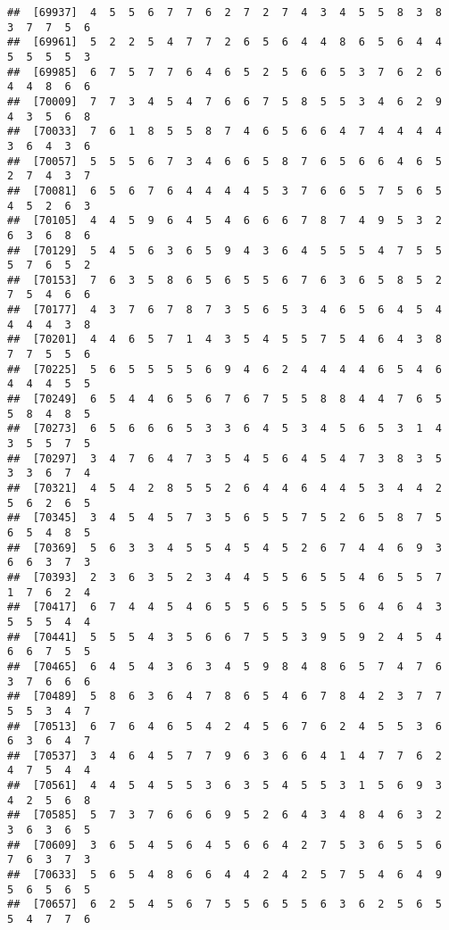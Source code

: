 \documentclass[
]{book}
\begin{document}
\begin{verbatim}
##  [69937]  4  5  5  6  7  7  6  2  7  2  7  4  3  4  5  5  8  3  8  3  7  7  5  6
##  [69961]  5  2  2  5  4  7  7  2  6  5  6  4  4  8  6  5  6  4  4  5  5  5  5  3
##  [69985]  6  7  5  7  7  6  4  6  5  2  5  6  6  5  3  7  6  2  6  4  4  8  6  6
##  [70009]  7  7  3  4  5  4  7  6  6  7  5  8  5  5  3  4  6  2  9  4  3  5  6  8
##  [70033]  7  6  1  8  5  5  8  7  4  6  5  6  6  4  7  4  4  4  4  3  6  4  3  6
##  [70057]  5  5  5  6  7  3  4  6  6  5  8  7  6  5  6  6  4  6  5  2  7  4  3  7
##  [70081]  6  5  6  7  6  4  4  4  4  5  3  7  6  6  5  7  5  6  5  4  5  2  6  3
##  [70105]  4  4  5  9  6  4  5  4  6  6  6  7  8  7  4  9  5  3  2  6  3  6  8  6
##  [70129]  5  4  5  6  3  6  5  9  4  3  6  4  5  5  5  4  7  5  5  5  7  6  5  2
##  [70153]  7  6  3  5  8  6  5  6  5  5  6  7  6  3  6  5  8  5  2  7  5  4  6  6
##  [70177]  4  3  7  6  7  8  7  3  5  6  5  3  4  6  5  6  4  5  4  4  4  4  3  8
##  [70201]  4  4  6  5  7  1  4  3  5  4  5  5  7  5  4  6  4  3  8  7  7  5  5  6
##  [70225]  5  6  5  5  5  5  6  9  4  6  2  4  4  4  4  6  5  4  6  4  4  4  5  5
##  [70249]  6  5  4  4  6  5  6  7  6  7  5  5  8  8  4  4  7  6  5  5  8  4  8  5
##  [70273]  6  5  6  6  6  5  3  3  6  4  5  3  4  5  6  5  3  1  4  3  5  5  7  5
##  [70297]  3  4  7  6  4  7  3  5  4  5  6  4  5  4  7  3  8  3  5  3  3  6  7  4
##  [70321]  4  5  4  2  8  5  5  2  6  4  4  6  4  4  5  3  4  4  2  5  6  2  6  5
##  [70345]  3  4  5  4  5  7  3  5  6  5  5  7  5  2  6  5  8  7  5  6  5  4  8  5
##  [70369]  5  6  3  3  4  5  5  4  5  4  5  2  6  7  4  4  6  9  3  6  6  3  7  3
##  [70393]  2  3  6  3  5  2  3  4  4  5  5  6  5  5  4  6  5  5  7  1  7  6  2  4
##  [70417]  6  7  4  4  5  4  6  5  5  6  5  5  5  5  6  4  6  4  3  5  5  5  4  4
##  [70441]  5  5  5  4  3  5  6  6  7  5  5  3  9  5  9  2  4  5  4  6  6  7  5  5
##  [70465]  6  4  5  4  3  6  3  4  5  9  8  4  8  6  5  7  4  7  6  3  7  6  6  6
##  [70489]  5  8  6  3  6  4  7  8  6  5  4  6  7  8  4  2  3  7  7  5  5  3  4  7
##  [70513]  6  7  6  4  6  5  4  2  4  5  6  7  6  2  4  5  5  3  6  6  3  6  4  7
##  [70537]  3  4  6  4  5  7  7  9  6  3  6  6  4  1  4  7  7  6  2  4  7  5  4  4
##  [70561]  4  4  5  4  5  5  3  6  3  5  4  5  5  3  1  5  6  9  3  4  2  5  6  8
##  [70585]  5  7  3  7  6  6  6  9  5  2  6  4  3  4  8  4  6  3  2  3  6  3  6  5
##  [70609]  3  6  5  4  5  6  4  5  6  6  4  2  7  5  3  6  5  5  6  7  6  3  7  3
##  [70633]  5  6  5  4  8  6  6  4  4  2  4  2  5  7  5  4  6  4  9  5  6  5  6  5
##  [70657]  6  2  5  4  5  6  7  5  5  6  5  5  6  3  6  2  5  6  5  5  4  7  7  6

\end{verbatim}
\end{document}
